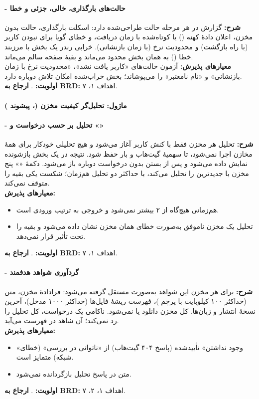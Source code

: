 \documentclass[12pt]{article}
\begin{document}
 \paragraph{ - حالت‌های بارگذاری، خالی، جزئی و خطا}
\textbf{شرح:} گزارش در هر مرحله حالت طراحی‌شده دارد: اسکلت بارگذاری، حالت بدون مخزن، اعلان دادهٔ کهنه () یا کوتاه‌شده با زمان دریافت، و خطای گویا برای نبودن کاربر (با راه بازگشت) و محدودیت نرخ (با زمان بازنشانی). خرابی رندر یک بخش با مرزبند خطا () به همان بخش محدود می‌ماند و بقیهٔ صفحه سالم می‌ماند.
\\
\textbf{معیارهای پذیرش:} آزمون  حالت‌های «کاربر یافت نشد»، «محدودیت نرخ با زمان بازنشانی» و «نام نامعتبر» را می‌پوشاند؛ بخش خراب‌شده امکان تلاش دوباره دارد.
\\
\textbf{اولویت:} . \textbf{ارجاع به BRD:} اهداف ۱، ۷.
 \paragraph{ماژول: تحلیل‌گر کیفیت مخزن (، پیشوند )}
 \paragraph{ - تحلیل بر حسب درخواست و «»}
\textbf{شرح:} تحلیل هر مخزن فقط با کنش کاربر آغاز می‌شود و هیچ تحلیلی خودکار برای همهٔ مخازن اجرا نمی‌شود، تا سهمیهٔ گیت‌هاب و بار  حفظ شود. نتیجه در یک بخش بازشونده نمایش داده می‌شود و پس از بستن بدون درخواست دوباره باز می‌شود. دکمهٔ «» پنج مخزن با جدیدترین  را تحلیل می‌کند، با حداکثر دو تحلیل هم‌زمان؛ شکست یکی بقیه را متوقف نمی‌کند.
\\
\textbf{معیارهای پذیرش:}
\begin{itemize}
\item هم‌زمانی هیچ‌گاه از ۲ بیشتر نمی‌شود و خروجی به ترتیب ورودی است.
\item تحلیل یک مخزن ناموفق به‌صورت خطای همان مخزن نشان داده می‌شود و بقیه را تحت تأثیر قرار نمی‌دهد.
\end{itemize}
\textbf{اولویت:} . \textbf{ارجاع به BRD:} اهداف ۱، ۷.
 \paragraph{ - گردآوری شواهد هدفمند}
\textbf{شرح:} برای هر مخزن این شواهد به‌صورت مستقل گرفته می‌شود: فرادادهٔ مخزن، متن  (حداکثر ۱۰۰ کیلوبایت با پرچم )، فهرست ریشهٔ فایل‌ها (حداکثر ۱۰۰۰ مدخل)، آخرین نسخهٔ انتشار و زبان‌ها. کل مخزن دانلود یا  نمی‌شود. ناکامی یک درخواست، کل تحلیل را رد نمی‌کند؛ آن شاهد در فهرست  می‌آید.
\\
\textbf{معیارهای پذیرش:}
\begin{itemize}
\item «وجود نداشتن» تأییدشده (پاسخ ۴۰۴ گیت‌هاب) از «ناتوانی در بررسی» (خطای شبکه) متمایز است.
\item متن  در پاسخ  تحلیل بازگردانده نمی‌شود.
\end{itemize}
\textbf{اولویت:} . \textbf{ارجاع به BRD:} اهداف ۱، ۲، ۷.
\end{document}
